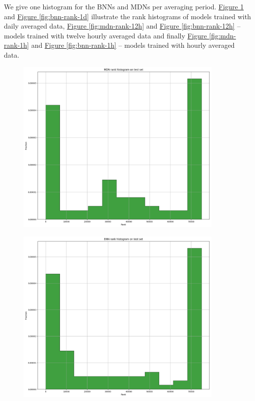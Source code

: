 \documentclass[12pt,a4paper,twoside]{scrartcl}
\numberwithin{equation}{section}
\newcommand{\reffig}[1]{\hyperref[#1]{Figure \ref*{#1}}}
\newcounter{mypagecount}%
\newenvironment{interlude}{%
  \clearpage
  \setcounter{mypagecount}{\value{page}}%
  \thispagestyle{empty}%
  \pagestyle{empty}%
}{%
  \clearpage
  \setcounter{page}{\value{mypagecount}}%
}
\begin{document}
\begin{interlude}
\begin{appendices}
    We give one histogram for the BNNs and MDNs per averaging period. \reffig{fig:mdn-rank-1d} and \reffig{fig:bnn-rank-1d} illustrate the rank histograms of models trained with daily averaged data, \reffig{fig:mdn-rank-12h} and \reffig{fig:bnn-rank-12h} -- models trained with twelve hourly averaged data and finally \reffig{fig:mdn-rank-1h} and \reffig{fig:bnn-rank-1h} -- models trained with hourly averaged data.
    \begin{center}
      \begin{figure}[htpb]
        \centering
        \includegraphics[height=0.6\textwidth, width=0.9\textwidth]{figures/model_plots/mdn-rank-1d}
        \caption[BNN one day rank histogram]{}\label{fig:mdn-rank-1d}
      \end{figure}
    \end{center}
    \begin{center}
      \begin{figure}[htpb]
        \centering
        \includegraphics[height=0.6\textwidth, width=0.9\textwidth]{figures/model_plots/bnn-rank-1d}

\end{figure}
\end{center}
\end{appendices}
\end{interlude}
\end{document}
